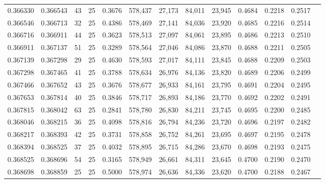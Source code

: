 \begin{tabular}{rrrrrrrrrrrrr}
0.366330 & 0.366543 &    43 &  25 &                                     0.3676 & 578,437 &  27,173 &  84,011 &  23,945 & 0.4684 & 0.2218 & 0.2517 \\
0.366546 & 0.366713 &    32 &  25 &                                     0.4386 & 578,469 &  27,141 &  84,036 &  23,920 & 0.4685 & 0.2216 & 0.2514 \\
0.366716 & 0.366911 &    44 &  25 &                                     0.3623 & 578,513 &  27,097 &  84,061 &  23,895 & 0.4686 & 0.2213 & 0.2510 \\
0.366911 & 0.367137 &    51 &  25 &                                     0.3289 & 578,564 &  27,046 &  84,086 &  23,870 & 0.4688 & 0.2211 & 0.2505 \\
0.367139 & 0.367298 &    29 &  25 &                                     0.4630 & 578,593 &  27,017 &  84,111 &  23,845 & 0.4688 & 0.2209 & 0.2503 \\
0.367298 & 0.367465 &    41 &  25 &                                     0.3788 & 578,634 &  26,976 &  84,136 &  23,820 & 0.4689 & 0.2206 & 0.2499 \\
0.367466 & 0.367652 &    43 &  25 &                                     0.3676 & 578,677 &  26,933 &  84,161 &  23,795 & 0.4691 & 0.2204 & 0.2495 \\
0.367653 & 0.367814 &    40 &  25 &                                     0.3846 & 578,717 &  26,893 &  84,186 &  23,770 & 0.4692 & 0.2202 & 0.2491 \\
0.367815 & 0.368042 &    63 &  25 &                                     0.2841 & 578,780 &  26,830 &  84,211 &  23,745 & 0.4695 & 0.2200 & 0.2485 \\
0.368046 & 0.368215 &    36 &  25 &                                     0.4098 & 578,816 &  26,794 &  84,236 &  23,720 & 0.4696 & 0.2197 & 0.2482 \\
0.368217 & 0.368393 &    42 &  25 &                                     0.3731 & 578,858 &  26,752 &  84,261 &  23,695 & 0.4697 & 0.2195 & 0.2478 \\
0.368394 & 0.368525 &    37 &  25 &                                     0.4032 & 578,895 &  26,715 &  84,286 &  23,670 & 0.4698 & 0.2193 & 0.2475 \\
0.368525 & 0.368696 &    54 &  25 &                                     0.3165 & 578,949 &  26,661 &  84,311 &  23,645 & 0.4700 & 0.2190 & 0.2470 \\
0.368698 & 0.368859 &    25 &  25 &                                     0.5000 & 578,974 &  26,636 &  84,336 &  23,620 & 0.4700 & 0.2188 & 0.2467 \\

\end{tabular}
